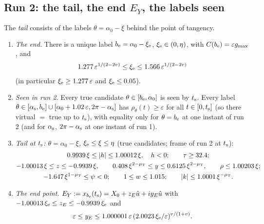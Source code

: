 \subsection{Run 2: the tail, the end \texorpdfstring{$E_Y$}{E\_Y}, the labels seen}\label{sec:T1-tail}

The \emph{tail} consists of the labels $\theta=\alpha_0-\xi$ behind the point of tangency.

\begin{lemma}\label{lem:T1-tail}
\begin{enumerate}
\item[(a)] \emph{The end.} There is a unique label $b_{\mathrm e}=\alpha_0-\xi_{\mathrm e}$, $\xi_{\mathrm e}\in(0,\eta)$, with $C(b_{\mathrm e})=\varepsilon g_{\max}$, and
\[
1.277\,\varepsilon^{1/(2-2v)}\le\xi_{\mathrm e}\le1.566\,\varepsilon^{1/(2-2v)}
\]
(in particular $\xi_{\mathrm e}\ge1.277\,\varepsilon$ and $\xi_{\mathrm e}\le0.05$).
\item[(b)] \emph{Seen in run 2.} Every true candidate $\theta\in[b_{\mathrm e},\alpha_0]$ is seen by $t_{\mathrm s}$. Every label
$\theta\in[\alpha_{\mathrm s},b_{\mathrm e}]\cup[\alpha_0+1.02\,\varepsilon,2\pi-\alpha_{\mathrm s}]$ has $\rho_\theta(t)\ge\varepsilon$ for all $t\in[0,t_{\mathrm s}]$ (so there
virtual $=$ true up to $t_{\mathrm s}$), with equality only for $\theta=b_{\mathrm e}$ at one instant of run 2 (and for $\alpha_{\mathrm s}$, $2\pi-\alpha_{\mathrm s}$ at one
instant of run 1).
\item[(c)] \emph{Tail at $t_{\mathrm s}$: $\theta=\alpha_0-\xi$, $\xi_{\mathrm e}\le\xi\le\eta$} (true candidates; frame of run 2 at $t_{\mathrm s}$):
\begin{gather*}
0.9939\,\xi\le|h|\le1.00012\,\xi,\quad h<0;\qquad\tau\ge32.4;\\
-1.00013\,\xi\le z\le-0.9939\,\xi,\qquad0.408\,\xi^{2-\mu_{\mathrm T}}\le y\le0.6125\,\xi^{2-\mu_{\mathrm T}},\qquad\rho\le1.00203\,\xi;\\
-1.647\,\xi^{1-\mu_{\mathrm T}}\le\psi<0;\qquad1\le w\le1.015;\qquad|k|\le1.0001\,\xi^{-\mu_{\mathrm T}}.
\end{gather*}
\item[(d)] \emph{The end point.} $E_Y:=x_{b_{\mathrm e}}(t_{\mathrm s})=X_0+z_E\hat u+iy_E\hat u$ with $-1.00013\,\xi_{\mathrm e}\le z_E\le-0.9939\,\xi_{\mathrm e}$ and
\[
\varepsilon\le y_E\le1.000001\,\varepsilon\,(2.0023\,\xi_{\mathrm e}/\varepsilon)^{v/(1+v)}.
\]
\end{enumerate}
\end{lemma}

